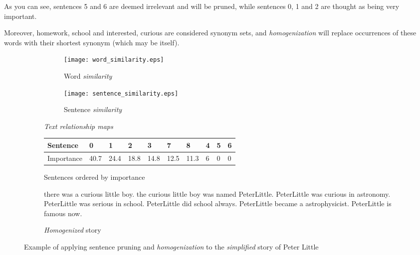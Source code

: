As you can see, sentences 5 and 6 are deemed irrelevant and will be pruned, while sentences 0, 1 and 2 are thought as being very important.

Moreover, {homework, school} and {interested, curious} are considered synonym sets, and \textit{homogenization} will replace occurrences of these words with their shortest synonym (which may be itself).

\begin{figure}[H]
\begin{subfigure}{\textwidth}
\begin{subfigure}{0.5\textwidth}
\renewcommand\thesubfigure{\roman{subfigure}}
\texttt{[image: word\_similarity.eps]}
\caption{Word \textit{similarity}}
\end{subfigure}
\begin{subfigure}{0.5\textwidth}
\renewcommand\thesubfigure{\roman{subfigure}}
\texttt{[image: sentence\_similarity.eps]}
\caption{Sentence \textit{similarity}}
\end{subfigure}
\setcounter{subfigure}{0}
\caption{\textit{Text relationship maps}}
\end{subfigure}
\begin{subfigure}{\textwidth}
\vspace{\baselineskip}
\centering
\begin{tabular}{@{}llllllllll@{}}
\toprule
Sentence   & 0    & 1    & 2    & 3    & 7    & 8    & 4 & 5 & 6 \\ \midrule
Importance & 40.7 & 24.4 & 18.8 & 14.8 & 12.5 & 11.3 & 6 & 0 & 0 \\ \bottomrule
\end{tabular}
\caption{Sentences ordered by importance}
\end{subfigure}
\begin{subfigure}{\textwidth}
\vspace{\baselineskip}
\begin{displayquote}
there was a curious little boy. the curious little boy was named PeterLittle. PeterLittle was curious in astronomy. PeterLittle was serious in school. PeterLittle did school always. PeterLittle became a astrophysicist. PeterLittle is famous now.
\end{displayquote}
\caption{\textit{Homogenized} story}
\end{subfigure}
\caption{Example of applying sentence pruning and \textit{homogenization} to the \textit{simplified} story of Peter Little}
\label{fig:preprocessor_example}
\end{figure}

